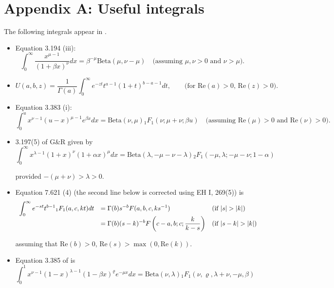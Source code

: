 \documentclass{article}[12pt]
\begin{document}



\newpage 

\section*{Appendix A: Useful integrals}

The following integrals appear in \cite{Gradshteyn2007}.
\begin{itemize}
\item 
Equation 3.194 (iii):
$$
\int_0^\infty \frac{ x^{\mu - 1} }{(1 + \beta x)^\nu} dx = \beta^{-\mu} \mbox{Beta}(\mu,\nu - \mu) \quad   \mbox{(assuming $\mu,\nu>0$ and $\nu>\mu$).}
$$

\item 
$$
U(a,b,z) = \frac{1}{\Gamma(a)}\int_0^\infty e^{-zt} t^{a - 1} (1 + t)^{b - a - 1} dt, 
\qquad \mbox{(for $\mbox{Re}(a)>0$, $\mbox{Re}(z)>0$)}.
$$


\item 
Equation 3.383 (i):
$$
\int_{0}^u x^{\nu - 1} (u - x)^{\mu - 1}  e^{\beta x} dx = \mbox{Beta}(\nu,\mu) {}_1 F_1(\nu;\mu+\nu;\beta u) \quad   \mbox{(assuming $\mbox{Re}(\mu)>0$ and $\mbox{Re}(\nu)>0$).}
$$


\item 3.197(5) of G\&R given by
$$
\int_0^\infty x^{\lambda - 1}(1 + x)^\nu (1 + \alpha x)^\mu dx
=\mbox{Beta}(\lambda,-\mu-\nu-\lambda){}_2F_1(-\mu,\lambda;-\mu-\nu; 1 - \alpha)
$$

\noindent provided $-(\mu  + \nu) > \lambda > 0$.
 

\item Equation 7.621 (4) 
(the second line below is corrected using EH I, 269(5))
is
$$
\begin{array}{rll}
\displaystyle \int_0^\infty e^{-st} t^{b-1} {}_1F_1(a,c,kt) dt
& \displaystyle = \Gamma(b)s^{-b} F(a,b,c,k s^{-1}) 
& \mbox{(if $|s| > |k|$)}
\\
& \displaystyle = \Gamma(b)(s - k)^{-b} F\left(c - a, b; c; \frac{k}{k - s} \right)
& \mbox{(if $|s - k| > |k|$)}
\end{array} 
$$

\noindent assuming that $\mbox{Re}(b)>0$, $\mbox{Re}(s) > \max(0,\mbox{Re}(k))$.

\item Equation 3.385  of \citep{Gradshteyn2007} is
\begin{equation} \label{res:04}
\int_{0}^1 x^{\nu - 1} (1 - x)^{\lambda - 1}(1 - \beta x)^{\varrho} e^{-\mu x} dx 
= \mbox{Beta}(\nu,\lambda) {}_1 F_1(\nu,\varrho,\lambda+\nu,-\mu,\beta)
\end{equation}


\end{itemize}
\end{document}
